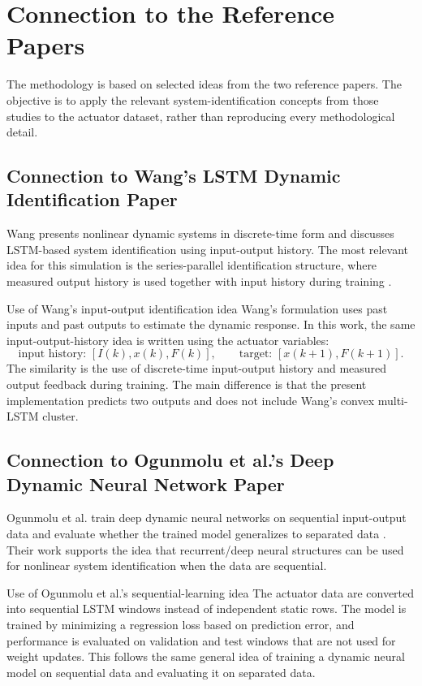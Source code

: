 \documentclass[11pt]{article}
\begin{document}
\section{Connection to the Reference Papers}
The methodology is based on selected ideas from the two reference papers. The objective is to apply the relevant system-identification concepts from those studies to the actuator dataset, rather than reproducing every methodological detail.

\subsection{Connection to Wang's LSTM Dynamic Identification Paper}
Wang presents nonlinear dynamic systems in discrete-time form and discusses LSTM-based system identification using input-output history. The most relevant idea for this simulation is the series-parallel identification structure, where measured output history is used together with input history during training \cite{wang2017}.

\begin{paperbox}{Use of Wang's input-output identification idea}
Wang's formulation uses past inputs and past outputs to estimate the dynamic response. In this work, the same input-output-history idea is written using the actuator variables:
\begin{equation}
\text{input history: }[I(k),x(k),F(k)], \qquad
\text{target: }[x(k+1),F(k+1)].
\end{equation}
The similarity is the use of discrete-time input-output history and measured output feedback during training. The main difference is that the present implementation predicts two outputs and does not include Wang's convex multi-LSTM cluster.
\end{paperbox}

\subsection{Connection to Ogunmolu et al.'s Deep Dynamic Neural Network Paper}
Ogunmolu et al. train deep dynamic neural networks on sequential input-output data and evaluate whether the trained model generalizes to separated data \cite{ogunmolu2016}. Their work supports the idea that recurrent/deep neural structures can be used for nonlinear system identification when the data are sequential.

\begin{paperbox}{Use of Ogunmolu et al.'s sequential-learning idea}
The actuator data are converted into sequential LSTM windows instead of independent static rows. The model is trained by minimizing a regression loss based on prediction error, and performance is evaluated on validation and test windows that are not used for weight updates. This follows the same general idea of training a dynamic neural model on sequential data and evaluating it on separated data.
\end{paperbox}
\end{document}
